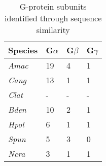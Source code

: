 
\begin{table}[tbp]
\centering
\begin{tabular}{llll}
  \hline
\hline
Species & G$\alpha$ & G$\beta$ & G$\gamma$ \\ 
  \hline
\emph{Amac} & 19 & 4 & 1 \\ 
  \emph{Cang} & 13 & 1 & 1 \\ 
  \emph{Clat} & - & - & - \\ 
   \hline
\emph{Bden} & 10 & 2 & 1 \\ 
  \emph{Hpol} & 6 & 1 & 1 \\ 
  \emph{Spun} & 5 & 3 & 0 \\ 
   \hline
\emph{Ncra} & 3 & 1 & 1 \\ 
   \hline
\hline
\end{tabular}
\caption{G-protein subunits identified through sequence similarity} 
\label{tab:ChRhodAux_Gprot}
\end{table}
